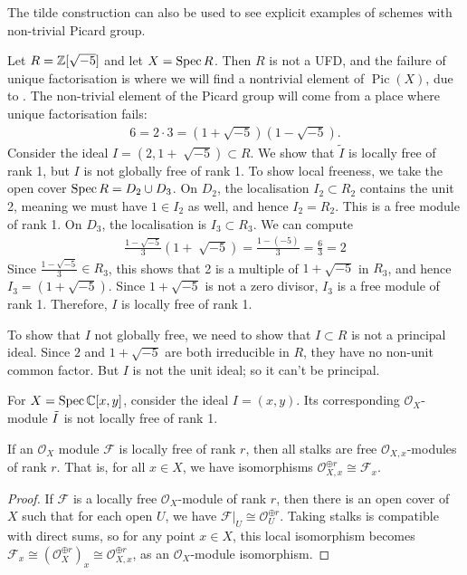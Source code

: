 The tilde construction can also be used to see explicit examples of schemes with non-trivial Picard group.

\begin{example}
  Let $R = \mathbb{Z}[\sqrt{-5}]$ and let $X = \operatorname{Spec} R$.  Then \(R\) is not a UFD, and the failure of unique factorisation is where we will find a nontrivial element of $\operatorname{Pic}(X)$, due to .
  The non-trivial element of the Picard group will come from a place where unique factorisation fails:
  	\begin{align*}
		6 = 2 \cdot 3 = (1 + \sqrt{-5}) (1 - \sqrt{-5}).
	\end{align*}
	Consider the ideal $I = (2, 1 + \sqrt[]{-5}) \subset R$.
        We show that \(\widetilde I\) is locally free of rank 1, but \(I\) is not globally free of rank 1.
        To show local freeness, we take the open cover \(\operatorname{Spec} R = D_2 \cup D_3\).
        On $D_2$, the localisation $I_2 \subset R_2$ contains the unit 2, meaning we must have $1 \in I_2$ as well, and hence $I_2 = R_2$. This is a free module of rank 1. 
       On $D_3$, the localisation is $I_3 \subset R_3$. We can compute
	\begin{align*}
		\frac{1 - \sqrt{-5}}{3} (1 + \sqrt[]{-5}) = \frac{1 - (-5)}{3} = \frac{6}{3} = 2
	\end{align*}
	Since $\frac{1 - \sqrt{-5}}{3} \in R_3$, this shows that 2 is a multiple of $1 + \sqrt{-5}$ in $R_3$, and hence $I_3 = (1 + \sqrt{-5})$. Since $1 + \sqrt{-5}$ is not a zero divisor, $I_3$ is a free module of rank 1.
        Therefore, \(I\) is locally free of rank 1.

        To show that \(I\) not globally free, we need to show that \(I \subset R\) is not a principal ideal.
        Since \(2\) and \(1+\sqrt{-5}\) are both irreducible in \(R\), they have no non-unit common factor.
        But \(I\) is not the unit ideal; so it can't be principal. 
\end{example}


\begin{nonexample}
	For $X = \operatorname{Spec} \mathbb{C}[x,y]$, consider the ideal $I = (x,y)$. Its corresponding $\mathcal{O}_X$-module $\Tilde{I}$ is not locally free of rank 1.
\end{nonexample}


\begin{proposition}
	If an $\mathcal{O}_X$ module $\mathcal{F}$ is locally free of rank $r$, then all stalks are free \(\mathcal{O}_{X,x}\)-modules of rank $r$.  That is, for all $x \in X$, we have isomorphisms $\mathcal{O}_{X,x}^{\oplus r} \cong \mathcal{F}_x$.
\end{proposition}
\begin{proof}
	If $\mathcal{F}$ is a locally free $\mathcal{O}_X$-module of rank $r$, then there is an open cover of $X$ such that for each open $U$, we have $\mathcal{F}|_U \cong \mathcal{O}_U^{\oplus r}$. Taking stalks is compatible with direct sums, so for any point $x \in X$, this local isomorphism becomes $\mathcal{F}_x \cong \left( \mathcal{O}_X^{\oplus r} \right)_x \cong \mathcal{O}_{X,x}^{\oplus r}$, as an $\mathcal{O}_X$-module isomorphism. 
\end{proof}

